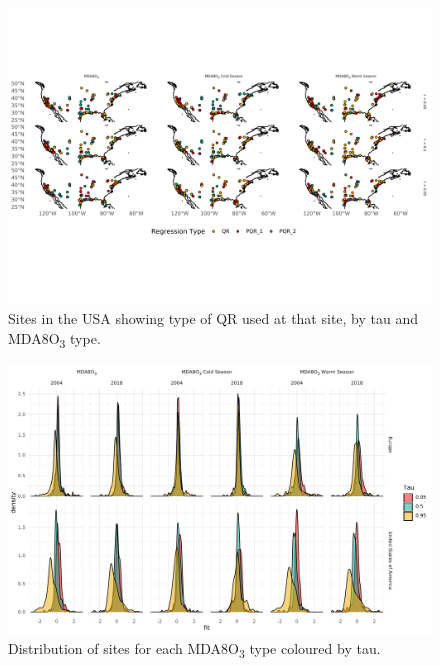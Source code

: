 \documentclass{article}
\begin{document}
\begin{figure}
\centering
\includegraphics[width=\linewidth]{figures/si_figures/fS04_regression_type_map_us.pdf}
\caption{Sites in the USA showing type of QR used at that site, by tau and MDA8O\textsubscript{3} type.}
\label{si_fig:reg_map_us}
\end{figure}
\clearpage


\begin{figure}
\centering
\includegraphics[width=\linewidth]{figures/si_figures/fS05_slope_density.pdf}
\caption{Distribution of sites for each MDA8O\textsubscript{3} type coloured by tau.}
\label{si_fig:slope_density}
\end{figure}
\clearpage

\end{document}
